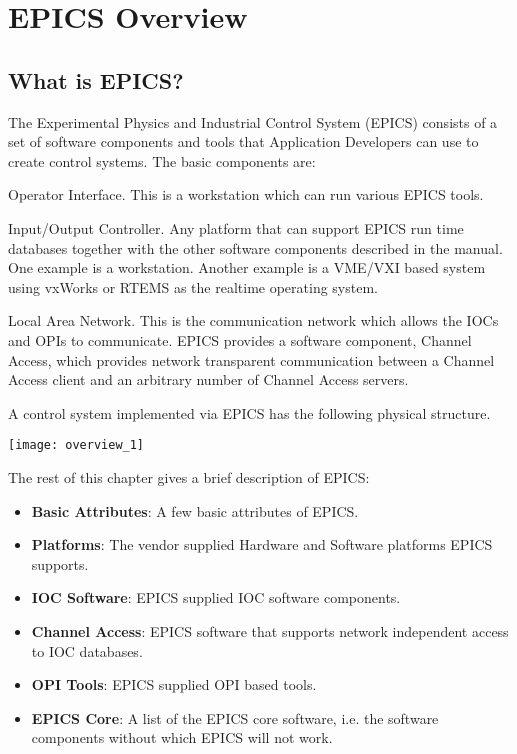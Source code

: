 \chapter{EPICS Overview}

\section{What is EPICS?}

The Experimental Physics and Industrial Control System (EPICS) consists of a set of software components and tools that
Application Developers can use to create control systems. The basic components are:

\begin{description}
\item [OPI] Operator Interface.
This is a workstation which can run various EPICS tools.

\item [IOC] Input/Output Controller.
Any platform that can support EPICS run time databases together with the other software components described in the manual.
One example is a workstation.
Another example is a VME/VXI based system using vxWorks or RTEMS as the realtime operating system.

\item [LAN] Local Area Network.
This is the communication network which allows the IOCs and OPIs to communicate.
EPICS provides a software component, Channel Access, which provides network transparent communication between a Channel Access client and an arbitrary number of Channel Access servers.
\end{description}

A control system implemented via EPICS has the following physical structure.

\begin{center}
\texttt{[image: overview\_1]}
\end{center}

The rest of this chapter gives a brief description of EPICS:

\begin{itemize}
\item \textbf{Basic Attributes}: A few basic attributes of EPICS.
\item \textbf{Platforms}: The vendor supplied Hardware and Software platforms EPICS supports.
\item \textbf{IOC Software}: EPICS supplied IOC software components.
\item \textbf{Channel Access}:  EPICS software that supports network independent access to IOC databases.
\item \textbf{OPI Tools}: EPICS supplied OPI based tools.
\item \textbf{EPICS Core}: A list of the EPICS core software, i.e. the software components without which EPICS will not work.
\end{itemize}

